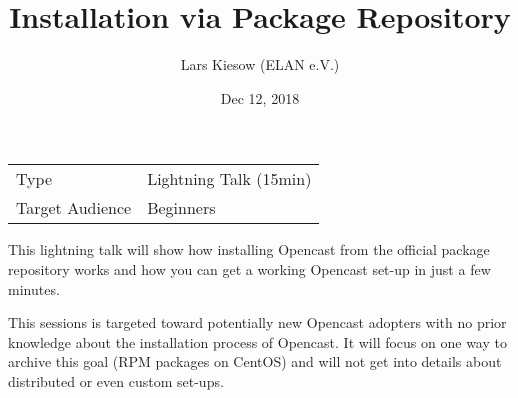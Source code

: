 \documentclass[a4paper]{article}
\title{Installation via Package Repository}
\date{Dec 12, 2018}
\author{Lars Kiesow (ELAN e.V.)}
\begin{document}
\maketitle

\begin{center}
\begin{tabular}{ll}
\toprule
	Type            & Lightning Talk (15min) \\
	Target Audience & Beginners \\
\bottomrule
\end{tabular}
\end{center}

\vspace{1em}

This lightning talk will show how installing Opencast from the official package
repository works and how you can get a working Opencast set-up in just a few
minutes.

This sessions is targeted toward potentially new Opencast adopters with no
prior knowledge about the installation process of Opencast. It will focus on
one way to archive this goal (RPM packages on CentOS) and will not get into
details about distributed or even custom set-ups.
\end{document}
